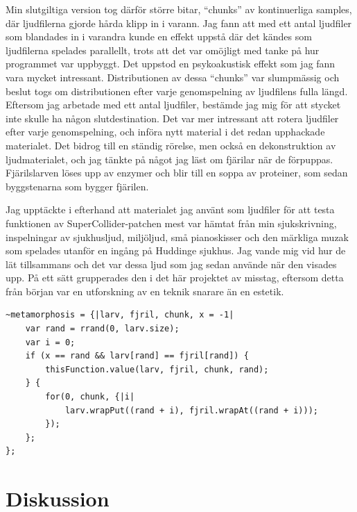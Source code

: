 \documentclass{article}
\renewcommand{\baselinestretch}{1.5}
\begin{document}
Min slutgiltiga version tog därför större bitar, ``chunks'' av kontinuerliga samples, där ljudfilerna gjorde
hårda klipp in i varann. Jag fann att med ett antal ljudfiler som blandades in i varandra kunde en effekt
uppstå där det kändes som ljudfilerna spelades parallellt, trots att det var omöjligt med tanke på hur
programmet var uppbyggt. Det uppstod en psykoakustisk effekt som jag fann vara mycket intressant.
Distributionen av dessa ``chunks'' var slumpmässig och beslut togs om distributionen efter varje genomspelning
av ljudfilens fulla längd. Eftersom jag arbetade med ett antal ljudfiler, bestämde jag mig för att stycket
inte skulle ha någon slutdestination. Det var mer intressant att rotera ljudfiler efter varje genomspelning,
och införa nytt material i det redan upphackade materialet. Det bidrog till en ständig rörelse, men också en
dekonstruktion av ljudmaterialet, och jag tänkte på något jag läst om fjärilar när de förpuppas. Fjärilslarven
löses upp av enzymer och blir till en soppa av proteiner, som sedan byggstenarna som bygger fjärilen.

Jag upptäckte i efterhand att materialet jag använt som ljudfiler för att testa funktionen av
SuperCollider-patchen mest var hämtat från min sjukskrivning, inspelningar av sjukhusljud, miljöljud, små
pianoskisser och den märkliga muzak som spelades utanför en ingång på Huddinge sjukhus. Jag vande mig vid hur
de lät tillsammans och det var dessa ljud som jag sedan använde när den visades upp. På ett sätt grupperades
den i det här projektet av misstag, eftersom detta från början var en utforskning av en teknik snarare än en
estetik.

\renewcommand{\baselinestretch}{1}
\begin{lstlisting}[style=SuperCollider-IDE, caption=Funktion från \emph{Metamorfos}]
~metamorphosis = {|larv, fjril, chunk, x = -1|
	var rand = rrand(0, larv.size);
	var i = 0;
	if (x == rand && larv[rand] == fjril[rand]) {
		thisFunction.value(larv, fjril, chunk, rand);
	} {
		for(0, chunk, {|i|
			larv.wrapPut((rand + i), fjril.wrapAt((rand + i)));
		});
	};
};
\end{lstlisting}
\renewcommand{\baselinestretch}{1.5}

\section{Diskussion}
\end{document}
